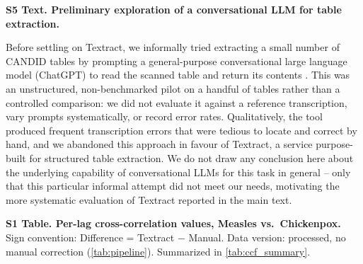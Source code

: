 \documentclass[12pt]{article}
\begin{document}
\bigskip
\noindent\textbf{S5 Text. Preliminary exploration of a conversational LLM for table extraction.}\label{sec:chatgpt-pilot}

Before settling on Textract, we informally tried extracting a small number of CANDID tables by prompting a general-purpose conversational large language model (ChatGPT) to read the scanned table and return its contents \cite{stewart}. This was an unstructured, non-benchmarked pilot on a handful of tables rather than a controlled comparison: we did not evaluate it against a reference transcription, vary prompts systematically, or record error rates. Qualitatively, the tool produced frequent transcription errors that were tedious to locate and correct by hand, and we abandoned this approach in favour of Textract, a service purpose-built for structured table extraction. We do not draw any conclusion here about the underlying capability of conversational LLMs for this task in general -- only that this particular informal attempt did not meet our needs, motivating the more systematic evaluation of Textract reported in the main text.

\bigskip
\noindent\textbf{S1 Table. Per-lag cross-correlation values, Measles vs.\ Chickenpox.} Sign convention: Difference = Textract $-$ Manual. Data version: processed, no manual correction (\cref{tab:pipeline}). Summarized in \cref{tab:ccf_summary}.
\end{document}

